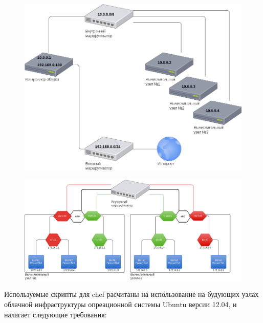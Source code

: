 \documentclass[letterpaper,10pt,russian]{sphinxmanual}
\begin{document}
\begin{figure}[htbp]
\centering

\includegraphics{first.png}
\end{figure}
\begin{figure}[htbp]
\centering

\includegraphics{second.png}
\end{figure}

Используемые скрипты для chef расчитаны на использование на будующих узлах облачной инфраструктуры опреационной системы Ubuntu версии 12.04, и налагает следующие требования:
\end{document}
